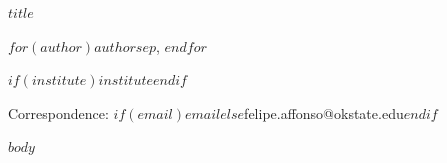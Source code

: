\documentclass[11pt]{article}
\begin{document}
\begin{center}
{\LARGE\bfseries
$title$\par}

\vspace{0.8em}

{\large
$for(author)$$author$$sep$, $endfor$\par}

\vspace{0.3em}

{\small\itshape
$if(institute)$$institute$$endif$\par}

\vspace{0.3em}

{\footnotesize
Correspondence: $if(email)$$email$$else$felipe.affonso@okstate.edu$endif$}

\end{center}

\vspace{1em}

$body$
\end{document}
